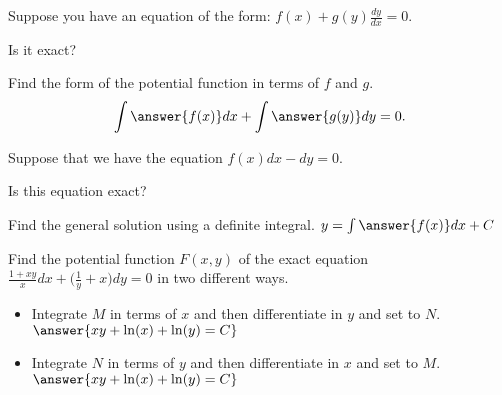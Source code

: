 \documentclass{ximera}
\begin{document}
\begin{exercise}
    Suppose you have an equation of the form: $f(x) + g(y) \frac{dy}{dx} = 0$.
    
    Is it exact? 
    \begin{problem}
        Find the form of the potential function in terms of $f$ and $g$. 
        \[
            \int \answer{f(x)}dx + \int \answer{g(y)}dy = 0.
        \]
    \end{problem}
\end{exercise}

\begin{exercise}
    Suppose that we have the equation $f(x) dx - dy = 0$.
    
    Is this equation exact? 
    \begin{problem}
        Find the general solution using a definite integral. $y = \int \answer{f(x)}dx + C$
    \end{problem}
\end{exercise}

\begin{exercise}
    Find the potential function $F(x,y)$ of the exact equation $\frac{1+xy}{x}dx + \bigl(\frac{1}{y} + x \bigr) dy = 0$ in two different ways.
    \begin{itemize}
        \item Integrate $M$ in terms of $x$ and then differentiate in $y$ and set to $N$. $\answer{xy + \ln(x) + \ln(y) = C}$
        \item Integrate $N$ in terms of $y$ and then differentiate in $x$ and set to $M$. $\answer{xy + \ln(x) + \ln(y) = C}$
    \end{itemize}
\end{exercise}
\end{document}
